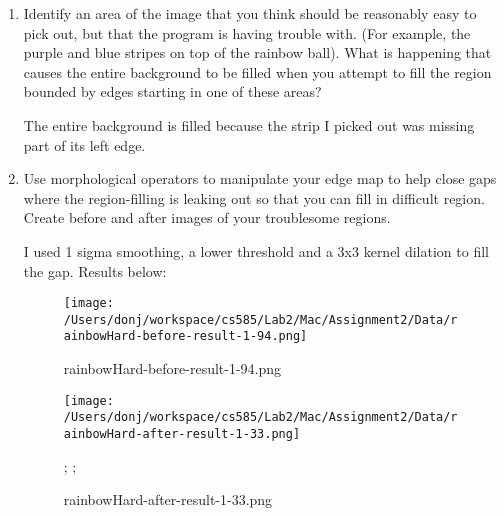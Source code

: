\documentclass{article}
\begin{document}
\begin{enumerate}
\item
Identify an area of the image that you think should be reasonably easy to pick out, but that the program is having trouble with. (For example, the purple and blue stripes on top of the rainbow ball). What is happening that causes the entire background to be filled when you attempt to fill the region bounded by edges starting in one of these areas?

The entire background is filled because the strip I picked out was missing part of its left edge.

\item
Use morphological operators to manipulate your edge map to help close gaps where the region-filling is leaking out so that you can fill in difficult region. Create before and after images of your troublesome regions. 

I used 1 sigma smoothing, a lower threshold and  a 3x3 kernel dilation to fill the gap. Results below:

\begin{figure}[H]
\centering
\texttt{[image: /Users/donj/workspace/cs585/Lab2/Mac/Assignment2/Data/rainbowHard-before-result-1-94.png]}
\caption{rainbowHard-before-result-1-94.png}
\label{overflow}
\end{figure}

\begin{figure}[H]
\centering
\texttt{[image: /Users/donj/workspace/cs585/Lab2/Mac/Assignment2/Data/rainbowHard-after-result-1-33.png]}
\caption{rainbowHard-after-result-1-33.png}
;\label{overflow}
;\end{figure}

\end{enumerate}
\end{document}
